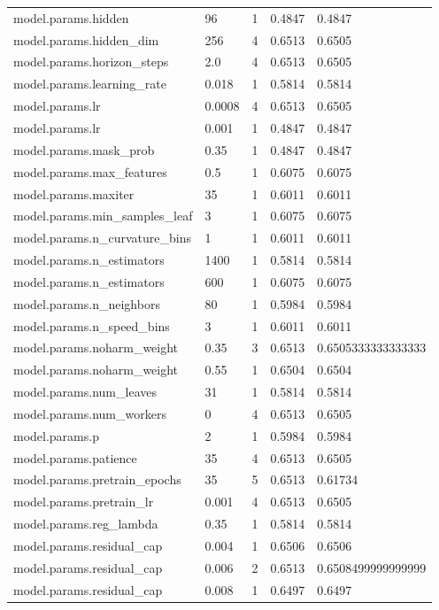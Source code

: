 \begin{tabular}{lllll}
model.params.hidden & 96 & 1 & 0.4847 & 0.4847 \\
model.params.hidden\_dim & 256 & 4 & 0.6513 & 0.6505 \\
model.params.horizon\_steps & 2.0 & 4 & 0.6513 & 0.6505 \\
model.params.learning\_rate & 0.018 & 1 & 0.5814 & 0.5814 \\
model.params.lr & 0.0008 & 4 & 0.6513 & 0.6505 \\
model.params.lr & 0.001 & 1 & 0.4847 & 0.4847 \\
model.params.mask\_prob & 0.35 & 1 & 0.4847 & 0.4847 \\
model.params.max\_features & 0.5 & 1 & 0.6075 & 0.6075 \\
model.params.maxiter & 35 & 1 & 0.6011 & 0.6011 \\
model.params.min\_samples\_leaf & 3 & 1 & 0.6075 & 0.6075 \\
model.params.n\_curvature\_bins & 1 & 1 & 0.6011 & 0.6011 \\
model.params.n\_estimators & 1400 & 1 & 0.5814 & 0.5814 \\
model.params.n\_estimators & 600 & 1 & 0.6075 & 0.6075 \\
model.params.n\_neighbors & 80 & 1 & 0.5984 & 0.5984 \\
model.params.n\_speed\_bins & 3 & 1 & 0.6011 & 0.6011 \\
model.params.noharm\_weight & 0.35 & 3 & 0.6513 & 0.6505333333333333 \\
model.params.noharm\_weight & 0.55 & 1 & 0.6504 & 0.6504 \\
model.params.num\_leaves & 31 & 1 & 0.5814 & 0.5814 \\
model.params.num\_workers & 0 & 4 & 0.6513 & 0.6505 \\
model.params.p & 2 & 1 & 0.5984 & 0.5984 \\
model.params.patience & 35 & 4 & 0.6513 & 0.6505 \\
model.params.pretrain\_epochs & 35 & 5 & 0.6513 & 0.61734 \\
model.params.pretrain\_lr & 0.001 & 4 & 0.6513 & 0.6505 \\
model.params.reg\_lambda & 0.35 & 1 & 0.5814 & 0.5814 \\
model.params.residual\_cap & 0.004 & 1 & 0.6506 & 0.6506 \\
model.params.residual\_cap & 0.006 & 2 & 0.6513 & 0.6508499999999999 \\
model.params.residual\_cap & 0.008 & 1 & 0.6497 & 0.6497 \\

\end{tabular}
